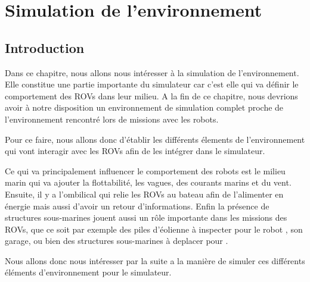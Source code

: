 \chapter{Simulation de l'environnement}
\label{chapitre:environnement}
	
	\section{Introduction}

		Dans ce chapitre, nous allons nous intéresser à la simulation de l'environnement. Elle constitue une partie importante du simulateur car c'est elle qui va définir le comportement des \gls{ROV}s dans leur milieu.  A la fin de ce chapitre, nous devrions avoir à notre disposition un environnement de simulation complet proche de l'environnement rencontré lors de missions avec les robots.

		Pour ce faire, nous allons donc d'établir les différents élements de l'environnement qui vont interagir avec les \gls{ROV}s afin de les intégrer dans le simulateur. 
		
		Ce qui va principalement influencer le comportement des robots est le milieu marin qui va ajouter la flottabilité, les vagues, des courants marins et du vent. Ensuite, il y a l'ombilical qui relie les \gls{ROV}s au bateau afin de l'alimenter en énergie mais aussi d'avoir un retour d'informations. Enfin la présence de structures sous-marines jouent aussi un rôle importante dans les missions des \gls{ROV}s, que ce soit par exemple des piles d'éolienne à inspecter pour le robot \argos{}, son garage, ou bien des structures sous-marines à deplacer pour \atoll{}.

		Nous allons donc nous intéresser par la suite a la manière de simuler ces différents éléments d'environnement pour le simulateur.



